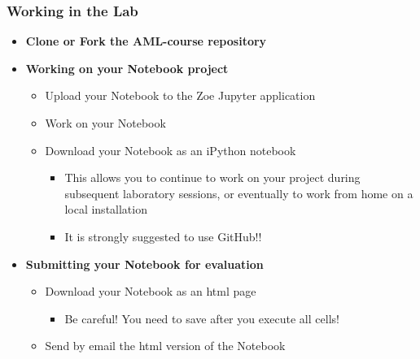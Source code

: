 \begin{frame}\frametitle{Working in the Lab}
\begin{itemize}
	\item {\bf Clone or Fork the AML-course repository}
	\item {\bf Working on your Notebook project}
	\begin{itemize}
		\item Upload your Notebook to the Zoe Jupyter application
		\item Work on your Notebook
		\item Download your Notebook as an iPython notebook
		\begin{itemize}
			\item This allows you to continue to work on your project during subsequent laboratory sessions, or eventually to work from home on a local installation
			\item It is strongly suggested to use GitHub!!
		\end{itemize}
	\end{itemize}
	\item {\bf Submitting your Notebook for evaluation}
	\begin{itemize}
		\item Download your Notebook as an html page
		\begin{itemize}
			\item Be careful! You need to save after you execute all cells!
		\end{itemize}
		\item Send by email the html version of the Notebook
	\end{itemize}
\end{itemize}
\end{frame}
